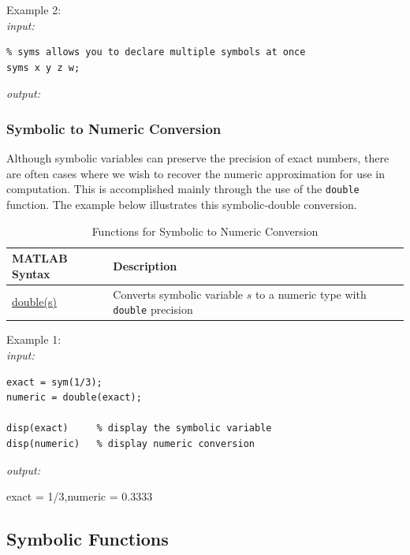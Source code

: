 \documentclass[../MATLAB_Primer.tex]{subfiles}
\begin{document}
Example 2:\\

\textit{input:}
\begin{lstlisting}
% syms allows you to declare multiple symbols at once
syms x y z w;
\end{lstlisting}
\textit{output:}

\subsubsection{Symbolic to Numeric Conversion}
Although symbolic variables can preserve the precision of exact numbers, there are often cases where we wish to recover the numeric approximation for use in computation. This is accomplished mainly through the use of the \texttt{double} function.  The example below illustrates this symbolic-double conversion.\\

\begin{table}[H]
\caption{Functions for Symbolic to Numeric Conversion}
    \begin{center}
        \begin{tabular}{| C{3cm} | m{12cm}|}
            \hline
            \textbf{MATLAB Syntax} & \textbf{Description}\\
            
            \hline
            \href{https://www.mathworks.com/help/symbolic/double.html}{\color{blue}double(s)} & Converts symbolic variable $s$ to a numeric type with \texttt{double} precision\\
            \hline

        \end{tabular}
        \label{tab:symnum_conversion}
    \end{center}
\end{table}

Example 1:\\

\textit{input:}
\begin{lstlisting}
exact = sym(1/3);
numeric = double(exact);

disp(exact)     % display the symbolic variable 
disp(numeric)   % display numeric conversion
\end{lstlisting}
\textit{output:}
\begin{center}
    exact = 1/3,\quad numeric = 0.3333
\end{center}


\subsection{Symbolic Functions}
\end{document}
